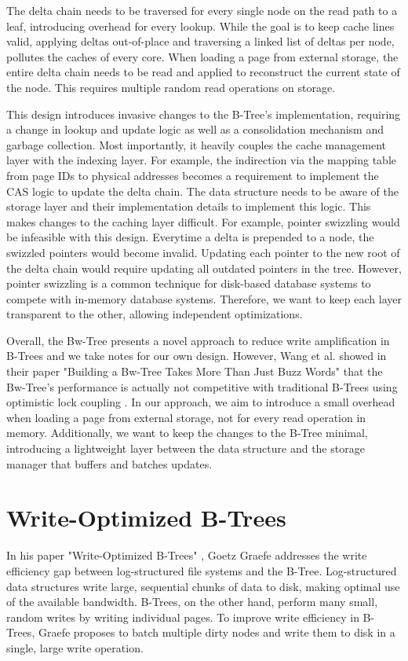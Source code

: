 The delta chain needs to be traversed for every single node on the read path to a leaf, introducing overhead for every lookup.
While the goal is to keep cache lines valid, applying deltas out-of-place and traversing a linked list of deltas per node, pollutes the caches of every core.
When loading a page from external storage, the entire delta chain needs to be read and applied to reconstruct the current state of the node.
This requires multiple random read operations on storage.

This design introduces invasive changes to the B-Tree's implementation, requiring a change in lookup and update logic as well as a consolidation mechanism and garbage collection. 
Most importantly, it heavily couples the cache management layer with the indexing layer.
For example, the indirection via the mapping table from page IDs to physical addresses becomes a requirement to implement the \ac{CAS} logic to update the delta chain.
The data structure needs to be aware of the storage layer and their implementation details to implement this logic.
This makes changes to the caching layer difficult. 
For example, pointer swizzling \cite{graefe2014memory} would be infeasible with this design. 
Everytime a delta is prepended to a node, the swizzled pointers would become invalid.
Updating each pointer to the new root of the delta chain would require updating all outdated pointers in the tree.
However, pointer swizzling is a common technique for disk-based database systems \cite{leis2018leanstore} to compete with in-memory database systems.
Therefore, we want to keep each layer transparent to the other, allowing independent optimizations.

Overall, the Bw-Tree presents a novel approach to reduce write amplification in B-Trees and we take notes for our own design.
However, Wang et al. showed in their paper "Building a Bw-Tree Takes More Than Just Buzz Words" \cite{wang2018bwtree} that the Bw-Tree's performance is actually not competitive with traditional B-Trees using optimistic lock coupling \cite{leis2019optimistic}.
In our approach, we aim to introduce a small overhead when loading a page from external storage, not for every read operation in memory.
Additionally, we want to keep the changes to the B-Tree minimal, introducing a lightweight layer between the data structure and the storage manager that buffers and batches updates.   

\section{Write-Optimized B-Trees}
In his paper "Write-Optimized B-Trees" \cite{graefe2004write}, Goetz Graefe addresses the write efficiency gap between log-structured file systems and the B-Tree.
Log-structured data structures write large, sequential chunks of data to disk, making optimal use of the available bandwidth.
B-Trees, on the other hand, perform many small, random writes by writing individual pages.
To improve write efficiency in B-Trees, Graefe proposes to batch multiple dirty nodes and write them to disk in a single, large write operation.

